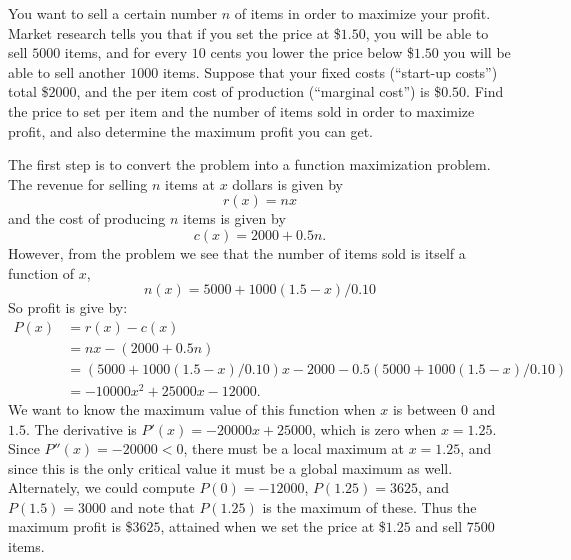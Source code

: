 \documentclass{ximera}
\begin{document}
\begin{example}
  You want to sell a certain number $n$ of items in order to maximize
  your profit.  Market research tells you that if you set the price at
  \$$1.50$, you will be able to sell $5000$ items, and for every $10$
  cents you lower the price below \$$1.50$ you will be able to sell
  another $1000$ items.  Suppose that your fixed costs (``start-up
  costs'') total \$$2000$, and the per item cost of production
  (``marginal cost'') is \$$0.50$.  Find the price to set per item and
  the number of items sold in order to maximize profit, and also
  determine the maximum profit you can get.
\begin{explanation}
The first step is to convert the problem into a function maximization
problem. The revenue for selling $n$ items at $x$ dollars is given by
\[
r(x) = nx
\]
and the cost of producing $n$ items is given by
\[
c(x) = 2000+0.5 n. 
\]
However, from the problem we see that the number of items sold is
itself a function of $x$,
\[
n(x) =5000+1000(1.5-x)/0.10
\]
So profit is give by:
\begin{align*}
P(x) &= r(x) - c(x)\\
&= nx - (2000+0.5 n)\\
&= (5000+1000(1.5-x)/0.10)x - 2000 - 0.5 (5000+1000(1.5-x)/0.10)\\
&=-10000x^2+25000x-12000. 
\end{align*}
We want to know the maximum value of this function when $x$ is between
0 and $1.5$. The derivative is $P'(x)=-20000x+25000$, which is zero
when $x=1.25$. Since $P''(x)=-20000<0$, there must be a local maximum
at $x=1.25$, and since this is the only critical value it must be a
global maximum as well. Alternately, we could compute $P(0)=-12000$,
$P(1.25)=3625$, and $P(1.5)=3000$ and note that $P(1.25)$ is the
maximum of these. Thus the maximum profit is \$$3625$, attained when we
set the price at \$$1.25$ and sell $7500$ items. 
\end{explanation}
\end{example}
\end{document}
